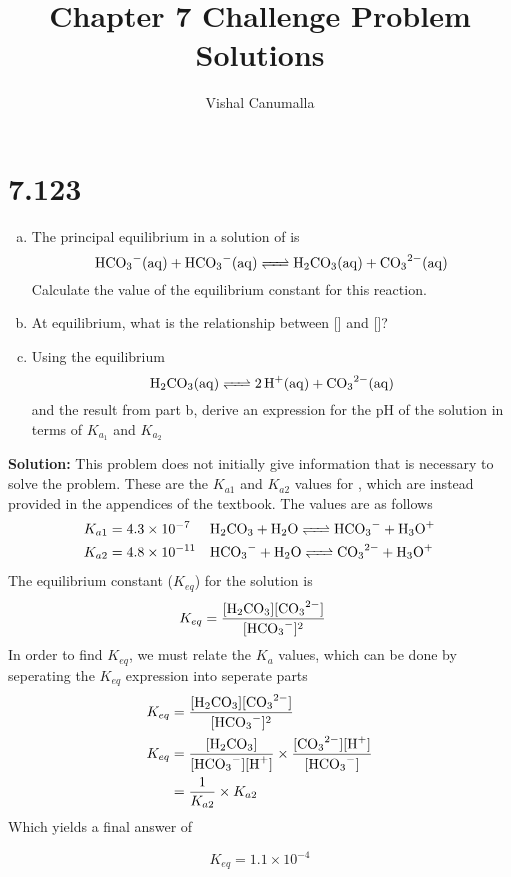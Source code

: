 \documentclass[11 pt]{article}
\title{Chapter 7 Challenge Problem Solutions}
\author{Vishal Canumalla}
\begin{document}
    \maketitle

    \section*{7.123}
    \begin{problemBox}
        \begin{enumerate}[a.]
            \item The principal equilibrium in a solution of 
            is $$\ce{HCO3-(aq) + HCO3-(aq) <=> H2CO3(aq) + CO3^2-(aq)}$$
            Calculate the value of the equilibrium constant for this reaction.
            \item At equilibrium, what is the relationship between []
            and []?
            \item Using the equilibrium $$\ce{H2CO3(aq) <=> 2H+(aq) + CO3^2-(aq)}$$
            and the result from part b, derive an expression for the pH of the solution in terms of $K_{a_1}$ and $K_{a_2}$
        \end{enumerate}
    \end{problemBox}
    \textbf{Solution:} This problem does not initially give information that is necessary
    to solve the problem. These are the $K_{a1}$ and $K_{a2}$ values for , which are instead provided
    in the appendices of the textbook. The values are as follows
    \begin{align*}
        K_{a1} &= 4.3 \times 10^{-7} && \ce{H2CO3 + H2O <=> HCO3- + H3O+}\\
        K_{a2} &= 4.8 \times 10^{-11} && \ce{HCO3- + H2O <=> CO3^2- + H3O+}
    \end{align*}
    The equilibrium constant ($K_{eq}$) for the solution is
    \begin{align*}
        K_{eq} &= \frac{[\ce{H2CO3}][\ce{CO3^2-}]}{[\ce{HCO3-}]^2}
    \end{align*}
    In order to find $K_{eq}$, we must relate the $K_a$ values, which can be done by
    seperating the $K_{eq}$ expression into seperate parts
    \begin{align*}
        K_{eq} &= \frac{[\ce{H2CO3}][\ce{CO3^2-}]}{[\ce{HCO3-}]^2} \\
        K_{eq} &= \frac{[\ce{H2CO3}]}{[\ce{HCO3-}][\ce{H+}]} \times \frac{[\ce{CO3^2-}][\ce{H+}]}{[\ce{HCO3-}]} \\
               &= \frac{1}{K_{a2}} \times K_{a2}
    \end{align*}
    Which yields a final answer of 
    \begin{answerBox}
        $$K_{eq} = 1.1 \times 10^{-4}$$
    \end{answerBox}
\end{document}
